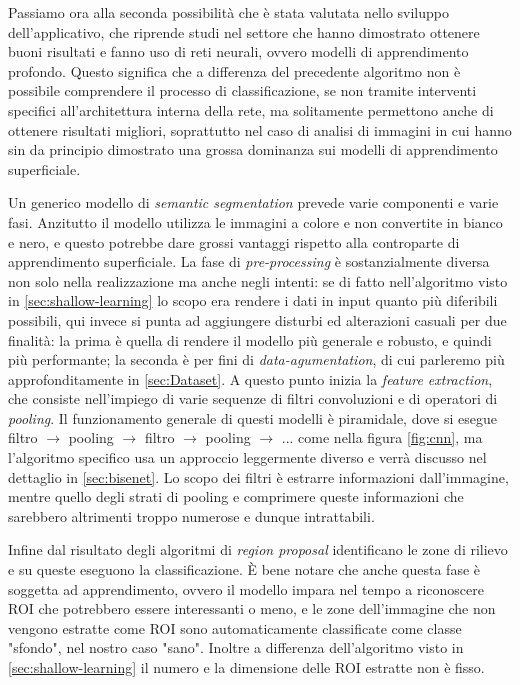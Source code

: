 Passiamo ora alla seconda possibilità che è stata valutata nello
sviluppo dell'applicativo, che riprende studi nel settore \cite{ilpaper}
che hanno dimostrato ottenere buoni risultati e fanno uso di reti neurali,
ovvero modelli di apprendimento profondo.
Questo significa che a differenza del precedente algoritmo non è possibile
comprendere il processo di classificazione, se non tramite interventi 
specifici all'architettura interna della rete, ma solitamente permettono
anche di ottenere risultati migliori, soprattutto nel caso di analisi di 
immagini in cui hanno sin da principio dimostrato una grossa dominanza 
sui modelli di apprendimento superficiale.

Un generico modello di {\it semantic segmentation} prevede varie
componenti e varie fasi.
Anzitutto il modello utilizza le immagini a colore e non convertite
in bianco e nero, e questo potrebbe dare grossi vantaggi rispetto
alla controparte di apprendimento superficiale.
La fase di {\it pre-processing} è sostanzialmente diversa non solo
nella realizzazione ma anche negli intenti:
se di fatto nell'algoritmo visto in \ref{sec:shallow-learning} lo
scopo era rendere i dati in input quanto più diferibili possibili,
qui invece si punta ad aggiungere disturbi ed alterazioni casuali per
due finalità:
la prima è quella di rendere il modello più generale e robusto,
e quindi più performante;
la seconda è per fini di {\it data-agumentation}, di cui 
parleremo più approfonditamente in \ref{sec:Dataset}.
A questo punto inizia la {\it feature extraction}, che consiste
nell'impiego di varie sequenze di filtri convoluzioni e di operatori
di {\it pooling}.
Il funzionamento generale di questi modelli è piramidale, dove si
esegue filtro $\to$ pooling $\to$ filtro $\to$ pooling $\to$ ...
come nella figura \ref{fig:cnn}, ma l'algoritmo specifico usa
un approccio leggermente diverso e verrà discusso nel dettaglio
in \ref{sec:bisenet}.
Lo scopo dei filtri è estrarre informazioni dall'immagine,
mentre quello degli strati di pooling e comprimere queste
informazioni che sarebbero altrimenti troppo numerose e dunque
intrattabili.

Infine dal risultato degli algoritmi di {\it region proposal}
identificano le zone di rilievo e su queste eseguono la classificazione.
È bene notare che anche questa fase è soggetta ad apprendimento,
ovvero il modello impara nel tempo a riconoscere ROI che potrebbero
essere interessanti o meno, e le zone dell'immagine che non
vengono estratte come ROI sono automaticamente classificate come
classe "sfondo", nel nostro caso "sano".
Inoltre a differenza dell'algoritmo visto in \ref{sec:shallow-learning}
il numero e la dimensione delle ROI estratte non è fisso.


